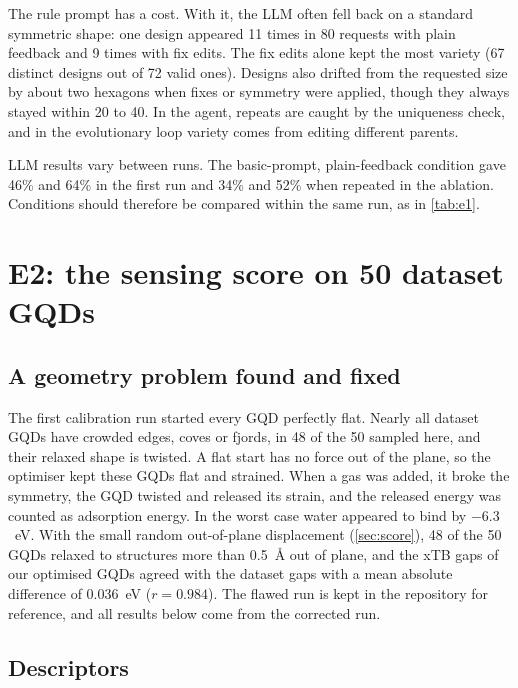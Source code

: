 The rule prompt has a cost. With it, the LLM often fell back on a standard symmetric shape: one
design appeared 11 times in 80 requests with plain feedback and 9 times with fix edits. The fix
edits alone kept the most variety (67 distinct designs out of 72 valid ones). Designs also drifted
from the requested size by about two hexagons when fixes or symmetry were applied, though they
always stayed within 20 to 40. In the agent, repeats are caught by the uniqueness check, and in
the evolutionary loop variety comes from editing different parents.

LLM results vary between runs. The basic-prompt, plain-feedback condition gave 46\% and 64\% in
the first run and 34\% and 52\% when repeated in the ablation. Conditions should therefore be
compared within the same run, as in \cref{tab:e1}.

\section{E2: the sensing score on 50 dataset GQDs}
\label{sec:res-e2}

\subsection{A geometry problem found and fixed}
\label{sec:res-flat}

The first calibration run started every GQD perfectly flat. Nearly all dataset GQDs have crowded
edges, coves or fjords, in 48 of the 50 sampled here, and their relaxed shape is twisted. A flat
start has no force out of the plane, so the optimiser kept these GQDs flat and strained. When a gas
was added, it broke the symmetry, the GQD twisted and released its strain, and the released energy
was counted as adsorption energy. In the worst case water appeared to bind by \(-6.3\)~eV. With
the small random out-of-plane displacement (\cref{sec:score}), 48 of the 50 GQDs relaxed to
structures more than 0.5~\AA{} out of plane, and the xTB gaps of our optimised GQDs agreed with the
dataset gaps with a mean absolute difference of 0.036~eV (\(r = 0.984\)). The flawed run is kept
in the repository for reference, and all results below come from the corrected run.

\subsection{Descriptors}

